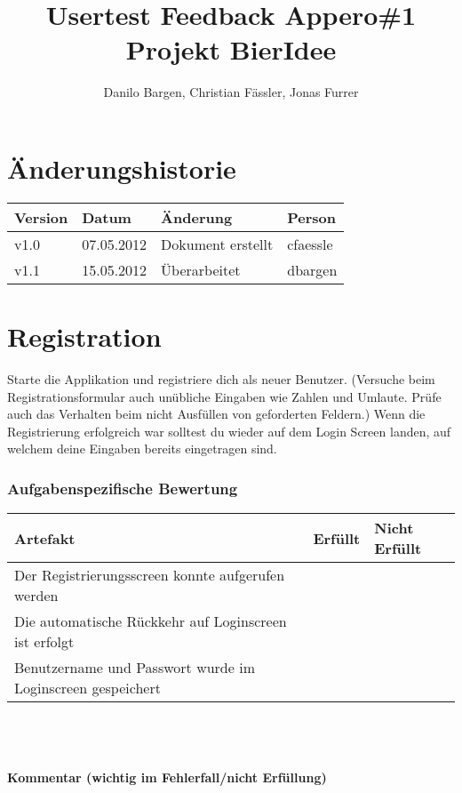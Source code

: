 \documentclass[10pt,a4paper]{scrartcl}
\author{Danilo Bargen, Christian Fässler, Jonas Furrer}
\title{Usertest Feedback Appero\#1\\ Projekt BierIdee}
\begin{document}
\begin{titlepage}
	\maketitle
	\vspace{120mm}
	\thispagestyle{empty} %
\end{titlepage}

\tableofcontents
\newpage

\section*{Änderungshistorie}
\begin{tabular}{p{}p{}p{}p{}}
\toprule
\textbf{Version} & \textbf{Datum} & \textbf{Änderung} & \textbf{Person} \\  
\midrule
v1.0 & 07.05.2012 & Dokument erstellt & cfaessle \\  
\hline 
v1.1 & 15.05.2012 & Überarbeitet & dbargen \\  
\hline 
\bottomrule
\end{tabular} 
\newpage

\section{Registration}
Starte die Applikation und registriere dich als neuer Benutzer. 
(Versuche beim Registrationsformular auch unübliche Eingaben wie Zahlen und Umlaute. Prüfe auch das Verhalten beim nicht Ausfüllen von geforderten Feldern.)
Wenn die Registrierung erfolgreich war solltest du wieder auf dem Login Screen landen, auf welchem deine Eingaben bereits eingetragen sind.

\subsubsection*{Aufgabenspezifische Bewertung}
\begin{tabular}{|p{}|p{}|p{}|}
\hline 
\textbf{Artefakt} & \textbf{Erfüllt} & \textbf{Nicht Erfüllt} \\ 
\hline 
Der Registrierungsscreen konnte aufgerufen werden &  &  \\ 
\hline 
Die automatische Rückkehr auf Loginscreen ist erfolgt &  &  \\ 
\hline 
Benutzername und Passwort wurde im Loginscreen gespeichert &  &  \\ 
\hline 
\end{tabular}
\\
\\
\\
\textbf{Kommentar (wichtig im Fehlerfall/nicht Erfüllung)}
\vspace*{3cm}
\end{document}
